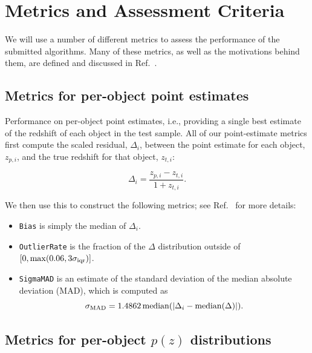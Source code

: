 \section{Metrics and Assessment Criteria}
\label{sec:metrics}

We will use a number of different metrics to assess the performance of
the submitted algorithms. Many of these metrics, as well as the
motivations behind them, are defined and discussed in
Ref.~\cite{therailteam2025}.

\subsection{Metrics for per-object point estimates}

Performance on per-object point estimates, i.e., providing a single
best estimate of the redshift of each object in the test sample. All
of our point-estimate metrics first compute the scaled residual,
$\Delta_i$, between the point estimate for each object, $z_{p,i}$, and
the true redshift for that object, $z_{t,i}$:

\begin{equation}
    \Delta_i = \frac{z_{p,i}-z_{t,i}}{1+z_{t,i}}.
\end{equation}

We then use this to construct the following metrics; see
Ref.~\cite{therailteam2025} for more details:

\begin{itemize}
    \item \texttt{Bias} is simply the median of $\Delta_i$.
    \item \texttt{OutlierRate} is the fraction of the $\Delta$ distribution
      outside of $[0, {\rm max}(0.06, 3\sigma_{\rm iqr})]$.
    \item \texttt{SigmaMAD} is an estimate of the standard deviation of
      the median absolute deviation (MAD), which is computed as      
    \begin{equation}
    {\sigma_{\rm MAD}} = 1.4862\,{\rm median}(|\Delta_i - {\rm median}(\Delta)|).
    \end{equation}
\end{itemize}


\subsection{\texorpdfstring{Metrics for per-object $p(z)$ distributions}{Metrics for per-object p(z) distributions}}

